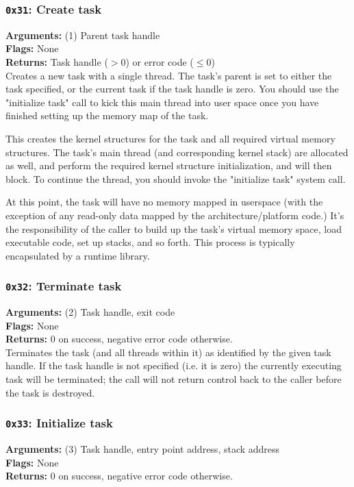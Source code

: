 \documentclass[11pt]{article}
\begin{document}
\subsubsection{{\tt 0x31}: Create task}
\textbf{Arguments:} (1) Parent task handle \\
\textbf{Flags:} None \\
\textbf{Returns:} Task handle ($>0$) or error code ($\leq0$) \\

Creates a new task with a single thread. The task's parent is set to either the task specified, or the current task if the task handle is zero. You should use the "initialize task" call to kick this main thread into user space once you have finished setting up the memory map of the task.

This creates the kernel structures for the task and all required virtual memory structures. The task's main thread (and corresponding kernel stack) are allocated as well, and perform the required kernel structure initialization, and will then block. To continue the thread, you should invoke the "initialize task" system call.

At this point, the task will have no memory mapped in userspace (with the exception of any read-only data mapped by the architecture/platform code.) It's the responsibility of the caller to build up the task's virtual memory space, load executable code, set up stacks, and so forth. This process is typically encapsulated by a runtime library.

\subsubsection{{\tt 0x32}: Terminate task}
\textbf{Arguments:} (2) Task handle, exit code \\
\textbf{Flags:} None \\
\textbf{Returns:} 0 on success, negative error code otherwise. \\

Terminates the task (and all threads within it) as identified by the given task handle. If the task handle is not specified (i.e. it is zero) the currently executing task will be terminated; the call will not return control back to the caller before the task is destroyed.

\subsubsection{{\tt 0x33}: Initialize task}
\textbf{Arguments:} (3) Task handle, entry point address, stack address \\
\textbf{Flags:} None \\
\textbf{Returns:} 0 on success, negative error code otherwise. \\
\end{document}
